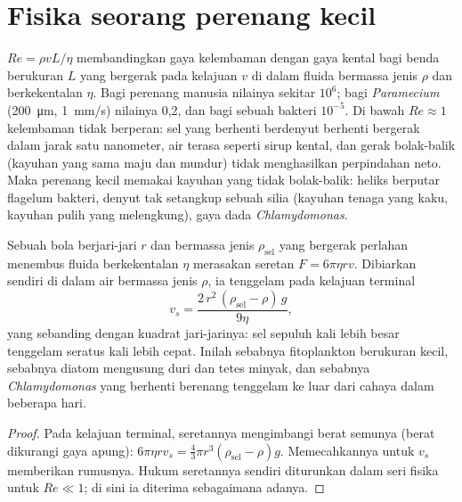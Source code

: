 \section{Fisika seorang perenang kecil}

\begin{proposition}\label{prop:b2:unicellular-diversity:reynolds}
\emph{} $Re = \rho v L/\eta$ membandingkan gaya
kelembaman dengan gaya kental bagi benda berukuran $L$ yang bergerak
pada kelajuan $v$ di dalam fluida bermassa jenis $\rho$ dan
berkekentalan $\eta$. Bagi perenang manusia nilainya sekitar $10^6$;
bagi \emph{Paramecium} (\qty{200}{\micro m}, \qty{1}{mm/s}) nilainya
0,2, dan bagi sebuah bakteri $10^{-5}$. Di bawah $Re \approx 1$
kelembaman tidak berperan: sel yang berhenti berdenyut berhenti
bergerak dalam jarak satu nanometer, air terasa seperti sirup kental,
dan gerak bolak-balik (kayuhan yang sama maju dan mundur) tidak
menghasilkan perpindahan neto. Maka perenang kecil memakai kayuhan yang
tidak bolak-balik: heliks berputar flagelum bakteri, denyut tak setangkup
sebuah silia (kayuhan tenaga yang kaku, kayuhan pulih yang melengkung),
gaya dada \emph{Chlamydomonas}.
\end{proposition}

\begin{theorem}\label{thm:b2:unicellular-diversity:stokes}
Sebuah bola berjari-jari $r$ dan bermassa jenis $\rho_{\text{sel}}$
yang bergerak perlahan menembus fluida berkekentalan $\eta$ merasakan
seretan $F = 6\pi\eta r v$. Dibiarkan sendiri di dalam air bermassa
jenis $\rho$, ia tenggelam pada kelajuan terminal
\[
v_s = \frac{2\,r^2\,(\rho_{\text{sel}} - \rho)\,g}{9\eta},
\]
yang sebanding dengan kuadrat jari-jarinya: sel sepuluh kali lebih
besar tenggelam seratus kali lebih cepat. Inilah sebabnya fitoplankton
berukuran kecil, sebabnya diatom mengusung duri dan tetes minyak, dan
sebabnya \emph{Chlamydomonas} yang berhenti berenang tenggelam ke luar
dari cahaya dalam beberapa hari.
\end{theorem}
\begin{proof}
Pada kelajuan terminal, seretannya mengimbangi berat semunya (berat
dikurangi gaya apung): $6\pi\eta r v_s = \tfrac{4}{3}\pi r^3
(\rho_{\text{sel}} - \rho) g$. Memecahkannya untuk $v_s$ memberikan
rumusnya. Hukum seretannya sendiri diturunkan dalam seri fisika untuk
$Re \ll 1$; di sini ia diterima sebagaimana adanya.
\end{proof}

